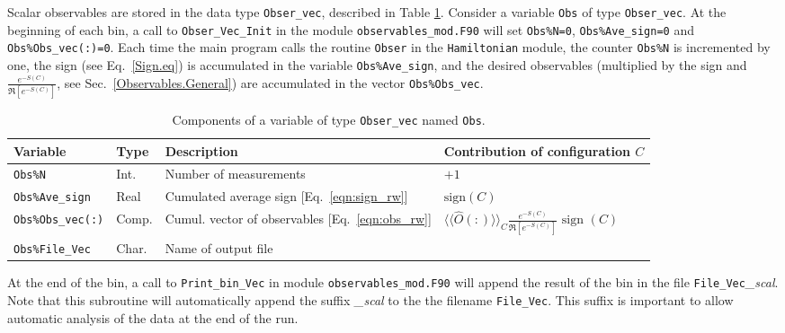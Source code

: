 Scalar observables are stored in the data type \texttt{Obser\_vec}, described in Table \ref{table:Obser_vec}. Consider  a variable \texttt{Obs} of type  \texttt{Obser\_vec}.  At the beginning of each bin,  a call to  \texttt{Obser\_Vec\_Init} in the module \texttt{observables\_mod.F90}  will  set   \texttt{Obs\%N=0},   \texttt{Obs\%Ave\_sign=0}  and  \texttt{Obs\%Obs\_vec(:)=0}.  Each time the main  program calls the routine \texttt{Obser}  in the  \texttt{Hamiltonian} module,  the counter \texttt{Obs\%N}   is incremented by one, the sign  (see Eq.~\ref{Sign.eq}) is accumulated in the  variable \texttt{Obs\%Ave\_sign},  and the desired observables (multiplied by the sign and   $\frac{e^{-S(C)}} {\Re \left[e^{-S(C)} \right]}$, see Sec.~\ref{Observables.General})  are accumulated in the vector \texttt{Obs\%Obs\_vec}.  
%
\begin{table}[h]
	\begin{center}
   \begin{tabular}{@{} l l l l @{}}\toprule
    Variable  &  Type      &  Description &  Contribution of configuration $C$ \\\midrule
    \texttt{Obs\%N}                       &  Int.       &    Number of measurements &    $+1$ \\
    \texttt{Obs\%Ave\_sign}               &  Real     	&    Cumulated average sign [Eq.~\eqref{eqn:sign_rw}] & $\text{sign}(C)$  \\
    \texttt{Obs\%Obs\_vec(:)}  		      &  Comp.      &    Cumul. vector of observables [Eq.~\eqref{eqn:obs_rw}] &
           $ \langle \langle \hat{O}(:) \rangle \rangle_{C}\frac{e^{-S(C)}} {\Re \left[e^{-S(C)} \right]} \text{ sign }(C) $ \\
     \texttt{Obs\%File\_Vec}           &  Char.    &    Name of output file  &\\\bottomrule
   \end{tabular}
   \caption{Components of a variable of type \texttt{Obser\_vec} named \texttt{Obs}.}
         \label{table:Obser_vec}
     \end{center}
\end{table}
%
At the end of the bin, a call to  \texttt{Print\_bin\_Vec}   in  module \texttt{observables\_mod.F90}  will  append the result of the bin in the file  \texttt{File\_Vec}\emph{\_scal}.  Note that this subroutine will automatically append the suffix \emph{\_scal}
to the the filename \texttt{File\_Vec}.
This suffix  is important to allow automatic analysis of the data at the end of the run. 


